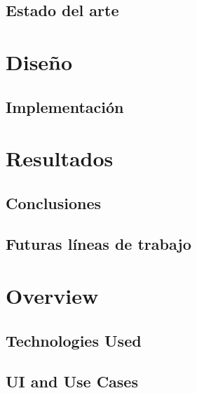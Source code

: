 \newpage

\section{Estado del arte}

\cleardoublepage

\chapter{Diseño}

\section{Implementación}

\cleardoublepage

\chapter{Resultados}

\section{Conclusiones}

\section{Futuras líneas de trabajo}

\chapter{Overview}

\section{Technologies Used}

\section{UI and Use Cases}

